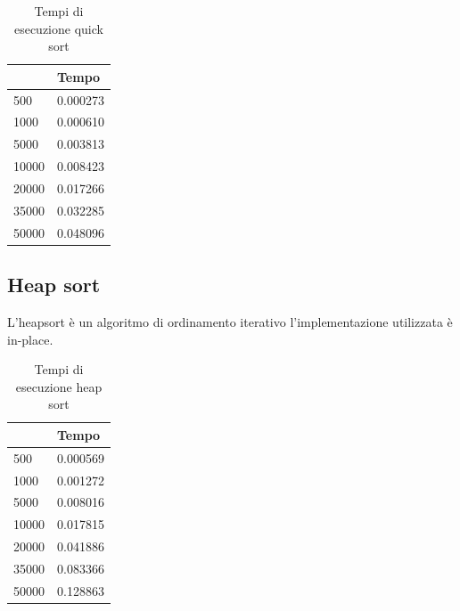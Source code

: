\documentclass[12pt,a4paper]{report}
\begin{document}
	

\begin{table}[ht]
\centering
\begin{tabular}{| l | l  |}
\hline
            & Tempo \\ \hline
500   & 0.000273      \\ \hline
1000  & 0.000610      \\ \hline
5000  & 0.003813     \\ \hline
10000 & 0.008423      \\ \hline
20000 & 0.017266     \\ \hline
35000 & 0.032285     \\ \hline
50000 & 0.048096    \\ \hline

\end{tabular}
\caption{Tempi di esecuzione quick sort}
\label{Tab:Tempi esecuzione QuickSort}
\end{table}

\subsection{Heap sort}
L'heapsort è un algoritmo di ordinamento iterativo l'implementazione utilizzata è in-place.

	

\begin{table}[ht]
\centering
\begin{tabular}{| l | l  |}
\hline
            & Tempo \\ \hline
500   & 0.000569      \\ \hline
1000  & 0.001272      \\ \hline
5000  & 0.008016     \\ \hline
10000 & 0.017815      \\ \hline
20000 & 0.041886     \\ \hline
35000 & 0.083366     \\ \hline
50000 & 0.128863    \\ \hline

\end{tabular}
\caption{Tempi di esecuzione heap sort}
\label{Tab:Tempi esecuzione HeapSort}
\end{table}
\end{document}
